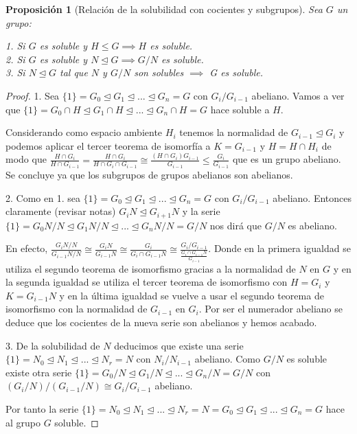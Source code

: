 \documentclass{article}
\theoremstyle{theorem-style}  %
\newtheorem{proposition}[theorem]{Proposición}
\theoremstyle{definition-style}
\theoremstyle{example-style}
\begin{document}
\begin{proposition}[Relación de la solubilidad con cocientes y subgrupos]
Sea $G$ un grupo:

1. Si $G$ es soluble y $H \le G \implies H$ es soluble.\\
2. Si $G$ es soluble y $N \trianglelefteq G \implies G/N$ es soluble.\\
3. Si $N \trianglelefteq G$ tal que $N$ y $G/N$ son solubles $\implies$ G es soluble.
\end{proposition}
\begin{proof}
1. Sea $\{1\} = G_0 \trianglelefteq G_1 \trianglelefteq ... \trianglelefteq G_n = G$ con $G_i/G_{i-1}$ abeliano. Vamos a ver que $\{1\} = G_0 \cap H \trianglelefteq G_1 \cap H \trianglelefteq ... \trianglelefteq G_n \cap H= G$ hace soluble a $H$.

Considerando como espacio ambiente $H_i$ tenemos la normalidad de $G_{i-1} \trianglelefteq G_i$ y podemos aplicar el tercer teorema de isomorfía a $K = G_{i-1}$ y $H = H \cap H_i$ de modo que $\frac{H \cap G_i}{H \cap G_{i-1}} = \frac{H \cap G_i}{H \cap G_{i} \cap G_{i-1}} \cong \frac{(H \cap G_i)G_{i-1}}{G_{i-1}} \le \frac{G_i}{G_{i-1}}$ que es un grupo abeliano. Se concluye ya que los subgrupos de grupos abelianos son abelianos.

2. Como en 1. sea $\{1\} = G_0 \trianglelefteq G_1 \trianglelefteq ... \trianglelefteq G_n = G$ con $G_i/G_{i-1}$ abeliano. Entonces claramente (revisar notas) $G_iN \trianglelefteq G_{i+1}N$ y la serie $\{1\} = G_0N/N \trianglelefteq G_1N/N \trianglelefteq ... \trianglelefteq G_nN/N = G/N$ nos dirá que $G/N$ es abeliano.

En efecto, $\frac{G_iN/N}{G_{i-1}N/N} \cong \frac{G_iN}{G_{i-1}N} \cong \frac{G_i}{G_i \cap G_{i-1}N} \cong \frac{G_i/G_{i-1}}{\frac{G_i \cap G_{i-1}N}{G_{i-1}}}$. Donde en la primera igualdad se utiliza el segundo teorema de isomorfismo gracias a la normalidad de $N$ en $G$ y en la segunda igualdad se utiliza el tercer teorema de isomorfismo con $H = G_{i}$ y $K = G_{i-1}N$ y en la última igualdad se vuelve a usar el segundo teorema de isomorfismo con la normalidad de $G_{i-1}$ en $G_i$. Por ser el numerador abeliano se deduce que los cocientes de la nueva serie son abelianos y hemos acabado.

3. De la solubilidad de $N$ deducimos que existe una serie $\{1\} = N_0 \trianglelefteq N_1 \trianglelefteq ... \trianglelefteq N_r = N$ con $N_i/N_{i-1}$ abeliano. Como $G/N$ es soluble existe otra serie $\{1\} = G_0/N \trianglelefteq G_1/N \trianglelefteq ... \trianglelefteq G_n/N = G/N$ con $(G_i/N)/(G_{i-1}/N) \cong G_i/G_{i-1}$ abeliano.

Por tanto la serie $\{1\} = N_0 \trianglelefteq N_1 \trianglelefteq ... \trianglelefteq N_r = N = G_0 \trianglelefteq G_1 \trianglelefteq ... \trianglelefteq G_n = G$ hace al grupo $G$ soluble.
\end{proof}
\end{document}
